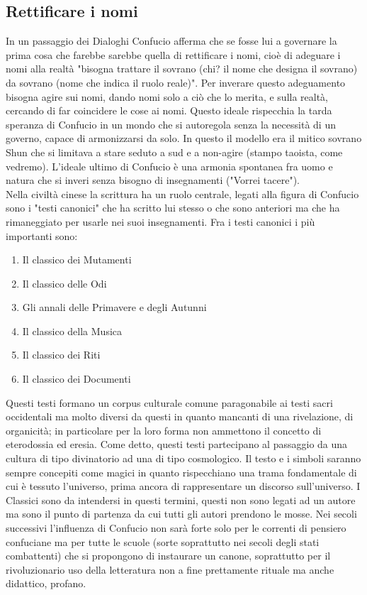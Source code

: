 \documentclass[10pt,a4paper]{report}
\begin{document}
\subsection{Rettificare i nomi}
In un passaggio dei Dialoghi Confucio afferma che se fosse lui a governare la prima cosa che farebbe sarebbe quella di rettificare i nomi, cioè di adeguare i nomi alla realtà "bisogna trattare il sovrano (chi? il nome che designa il sovrano) da sovrano (nome che indica il ruolo reale)". Per inverare questo adeguamento bisogna agire sui nomi, dando nomi solo a ciò che lo merita, e sulla realtà, cercando di far coincidere le cose ai nomi. Questo ideale rispecchia la tarda speranza di Confucio in un mondo che si autoregola senza la necessità di un governo, capace di armonizzarsi da solo. In questo il modello era il mitico sovrano Shun che si limitava a stare seduto a sud e a non-agire (stampo taoista, come vedremo). L'ideale ultimo di Confucio è una armonia spontanea fra uomo e natura che si inveri senza bisogno di insegnamenti ("Vorrei tacere").\\
Nella civiltà cinese la scrittura ha un ruolo centrale, legati alla figura di Confucio sono i "testi canonici" che ha scritto lui stesso o che sono anteriori ma che ha rimaneggiato per usarle nei suoi insegnamenti. Fra i testi canonici i più importanti sono:
\begin{enumerate}
	\item Il classico dei Mutamenti
	\item Il classico delle Odi
	\item Gli annali delle Primavere e degli Autunni
	\item Il classico della Musica
	\item Il classico dei Riti
	\item Il classico dei Documenti
\end{enumerate}
Questi testi formano un corpus culturale comune paragonabile ai testi sacri occidentali ma molto diversi da questi in quanto mancanti di una rivelazione, di organicità; in particolare per la loro forma non ammettono il concetto di eterodossia ed eresia. Come detto, questi testi partecipano al passaggio da una cultura di tipo divinatorio ad una di tipo cosmologico. Il testo e i simboli saranno sempre concepiti come magici in quanto rispecchiano una trama fondamentale di cui è tessuto l'universo, prima ancora di rappresentare un discorso sull'universo. I Classici sono da intendersi in questi termini, questi non sono legati ad un autore ma sono il punto di partenza da cui tutti gli autori prendono le mosse. Nei secoli successivi l'influenza di Confucio non sarà forte solo per le correnti di pensiero confuciane ma per tutte le scuole (sorte soprattutto nei secoli degli stati combattenti) che si propongono di instaurare un canone, soprattutto per il rivoluzionario uso della letteratura non a fine prettamente rituale ma anche didattico, profano. 
\end{document}
